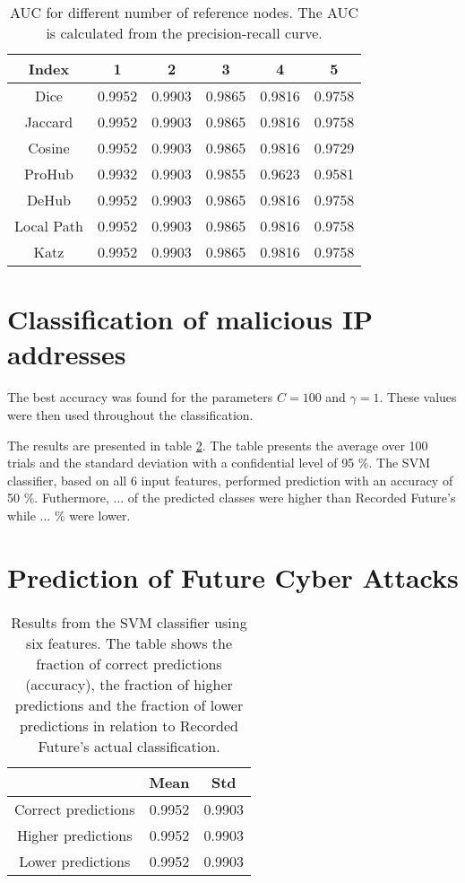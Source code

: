\begin{table}[h!]
    \centering
    \caption{AUC for different number of reference nodes. The AUC is calculated from the precision-recall curve.}
    \begin{tabular}{|c|c|c|c|c|c|} %
    \hline
        Index   & 1 & 2 & 3 & 4 & 5 \\ \hline
        Dice    & 0.9952 &  0.9903  & 0.9865 & 0.9816 & 0.9758 \\
        Jaccard & 0.9952 &  0.9903  & 0.9865 & 0.9816 & 0.9758\\
        Cosine  & 0.9952 &  0.9903  & 0.9865 & 0.9816 & 0.9729 \\
        ProHub  & 0.9932 &  0.9903  & 0.9855 & 0.9623 & 0.9581 \\
        DeHub   & 0.9952 &  0.9903  & 0.9865 & 0.9816 & 0.9758 \\
        Local Path   & 0.9952 &  0.9903  & 0.9865 & 0.9816 & 0.9758 \\
        Katz   & 0.9952 &  0.9903  & 0.9865 & 0.9816 & 0.9758 \\ \hline
    \end{tabular}
    \label{aucIndex2}
\end{table}

\section{Classification of malicious IP addresses}

The best accuracy was found for the parameters $C=100$ and $\gamma=1$. These values were then used throughout the classification. 

The results are presented in table \ref{IpRes}. The table presents the average over 100 trials and the standard deviation with a confidential level of 95 \%. The SVM classifier, based on all 6 input features, performed prediction with an accuracy of 50 \%. Futhermore, ... of the predicted classes were higher than Recorded Future's while ... \% were lower. 

\section{Prediction of Future Cyber Attacks}


\begin{table}[h!]
    \centering
    \caption{Results from the SVM classifier using six features. The table shows the fraction of correct predictions (accuracy), the fraction of higher predictions and the fraction of lower predictions in relation to Recorded Future's actual classification.}
    \begin{tabular}{|c|c|c|}
    \hline
        ~   & Mean & Std  \\ \hline
        Correct predictions & 0.9952 &  0.9903 \\
        Higher predictions  & 0.9952 &  0.9903\\
        Lower predictions   & 0.9952 &  0.9903\\ \hline
    \end{tabular}
    \label{IpRes}
\end{table}

